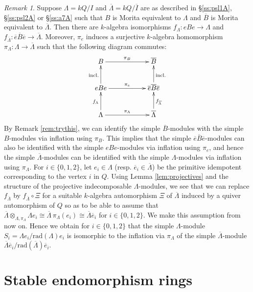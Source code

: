 \documentclass{amsart}
\theoremstyle{plain}
\theoremstyle{definition}
\theoremstyle{remark}
\newtheorem{rem}[thm]{Remark}
\begin{document}
\begin{rem}
Suppose $\Lambda=kQ/I$ and $\overline{\Lambda}=kQ/\overline{I}$ are
as described in 
\S\ref{ss:psl1A}, \S\ref{ss:psl2A} or \S\ref{ss:a7A}
such that $B$ is Morita equivalent to
$\Lambda$ and $\overline{B}$ is Morita equivalent to $\overline{\Lambda}$.
Then there are $k$-algebra isomorphisms $f_{\Lambda}:eBe\to \Lambda$ and 
$f_{\overline{\Lambda}}: \overline{e}\overline{B}\overline{e}\to \overline{\Lambda}$. Moreover,
$\pi_e$ induces a surjective $k$-algebra homomorphism 
$\pi_\Lambda:\Lambda\to \overline{\Lambda}$ such that the 
following diagram commutes:
\begin{equation}
\label{eq:diagram}
\xymatrix {
B\ar[rr]^{\pi_B}&&\overline{B}\\
eBe\ar[u]^{\mathrm{incl.}}\ar[rr]^{\pi_e}&& \overline{e}\overline{B}\overline{e}\ar[u]_{\mathrm{incl.}}\\
\Lambda\ar[u]^{f_\Lambda}\ar[rr]^{\pi_\Lambda}&&\overline{\Lambda}\ar[u]_{f_{\overline{\Lambda}}}
}
\end{equation}
By Remark \ref{rem:trythis}, we can identify the simple $\overline{B}$-modules with the simple
$B$-modules via inflation using $\pi_B$. This implies that the simple 
$\overline{e}\overline{B}\overline{e}$-modules can also be identified with the simple $eBe$-modules
via inflation using $\pi_e$, and hence the simple $\overline{\Lambda}$-modules can be 
identified with the simple $\Lambda$-modules via inflation using $\pi_\Lambda$.
For $i\in\{0,1,2\}$, let $e_i\in \Lambda$ (resp. $\overline{e}_i\in\overline{\Lambda}$)
be the primitive idempotent corresponding to the vertex $i$ in $Q$.
Using Lemma \ref{lem:projectives}
and the structure of the projective indecomposable $\Lambda$-modules, 
we see that we can replace $f_{\overline{\Lambda}}$ by
$f_{\overline{\Lambda}}\circ\Xi$ 
for a suitable $k$-algebra automorphism $\Xi$ of $\overline{\Lambda}$ induced by a quiver 
automorphism of $Q$ so as
to be able to assume that
$\overline{\Lambda}\otimes_{\Lambda,\pi_\Lambda} \Lambda e_i \cong
\overline{\Lambda}\, \pi_\Lambda(e_i)\cong  \overline{\Lambda}\overline{e}_i$ for $i\in\{0,1,2\}$. 
We make this assumption from now on. Hence we obtain for $i\in\{0,1,2\}$ that
the simple $\Lambda$-module $S_i=\Lambda e_i/\mathrm{rad}(\Lambda) e_i$ is isomorphic to the
inflation via $\pi_\Lambda$ of the simple $\overline{\Lambda}$-module 
$\overline{\Lambda} \overline{e}_i/\mathrm{rad}(\overline{\Lambda})\overline{e}_i$.
\end{rem}

\section{Stable endomorphism rings}
\label{s:stablend}
\setcounter{equation}{0}
\setcounter{figure}{0}
\end{document}
